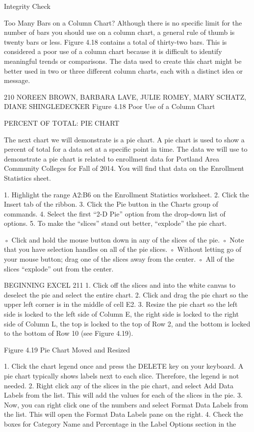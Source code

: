 Integrity Check

Too Many Bars on a Column Chart?
Although there is no specific limit for the number of bars you should use on a column chart, a general rule of thumb
is twenty bars or less. Figure 4.18 contains a total of thirty-two bars. This is considered a poor use of a column
chart because it is difficult to identify meaningful trends or comparisons. The data used to create this chart might
be better used in two or three different column charts, each with a distinct idea or message.




210 NOREEN BROWN, BARBARA LAVE, JULIE ROMEY, MARY SCHATZ, DIANE SHINGLEDECKER
Figure 4.18 Poor Use of a Column Chart


PERCENT OF TOTAL: PIE CHART

The next chart we will demonstrate is a pie chart. A pie chart is used to show a percent of total for
a data set at a specific point in time. The data we will use to demonstrate a pie chart is related to
enrollment data for Portland Area Community Colleges for Fall of 2014. You will find that data on
the Enrollment Statistics sheet.

1.   Highlight the range A2:B6 on the Enrollment Statistics worksheet.
2.   Click the Insert tab of the ribbon.
3.   Click the Pie button in the Charts group of commands.
4.   Select the first “2-D Pie” option from the drop-down list of options.
5.   To make the “slices” stand out better, “explode” the pie chart.

◦ Click and hold the mouse button down in any of the slices of the pie.
◦ Note that you have selection handles on all of the pie slices.
◦ Without letting go of your mouse button; drag one of the slices away from the center.
◦ All of the slices “explode” out from the center.


BEGINNING EXCEL 211
1. Click off the slices and into the white canvas to deselect the pie and select the entire chart.
2. Click and drag the pie chart so the upper left corner is in the middle of cell E2.
3. Resize the pie chart so the left side is locked to the left side of Column E, the right side is locked
to the right side of Column L, the top is locked to the top of Row 2, and the bottom is locked to
the bottom of Row 10 (see Figure 4.19).




Figure 4.19 Pie Chart Moved and Resized


1. Click the chart legend once and press the DELETE key on your keyboard. A pie chart typically
shows labels next to each slice. Therefore, the legend is not needed.
2. Right click any of the slices in the pie chart, and select Add Data Labels from the list. This will
add the values for each of the slices in the pie.
3. Now, you can right click one of the numbers and select Format Data Labels from the list. This
will open the Format Data Labels pane on the right.
4. Check the boxes for Category Name and Percentage in the Label Options section in the




